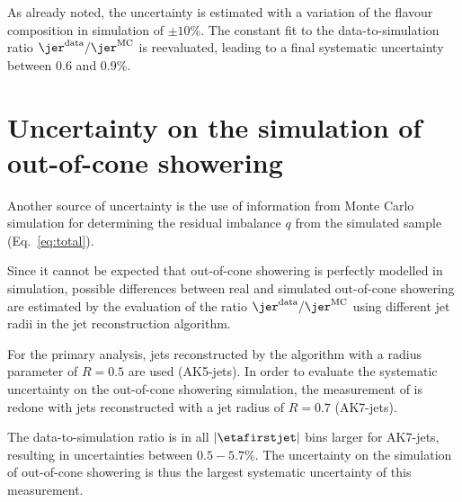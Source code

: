 As already noted, the uncertainty is estimated with a variation of the flavour composition in simulation of $\pm10\%$.
The constant fit to the data-to-simulation ratio $\jer^{\text{data}}/\jer^{\text{MC}}$ is reevaluated, leading to a final systematic uncertainty between 0.6 and 0.9\%.

\section*{Uncertainty on the simulation of out-of-cone showering}
Another source of uncertainty is the use of information from Monte Carlo simulation for determining the residual imbalance $q$ from the simulated \GAMJET sample (Eq.~\eqref{eq:total}).

Since it cannot be expected that out-of-cone showering is perfectly modelled in simulation, possible differences between real and simulated out-of-cone showering are estimated by the evaluation of the ratio $\jer^{\text{data}}/\jer^{\text{MC}}$ using different jet radii in the jet reconstruction algorithm. 

For the primary analysis, jets reconstructed by the \antikt algorithm with a radius parameter of $R=0.5$ are used (AK5-jets). 
In order to evaluate the systematic uncertainty on the out-of-cone showering simulation, the measurement of \rhores is redone with jets reconstructed with a jet radius of $R=0.7$ (AK7-jets). 

The data-to-simulation ratio is in all $|\etafirstjet|$ bins larger for AK7-jets, resulting in uncertainties between $0.5-5.7\%$.
The uncertainty on the simulation of out-of-cone showering is thus the largest systematic uncertainty of this measurement.

